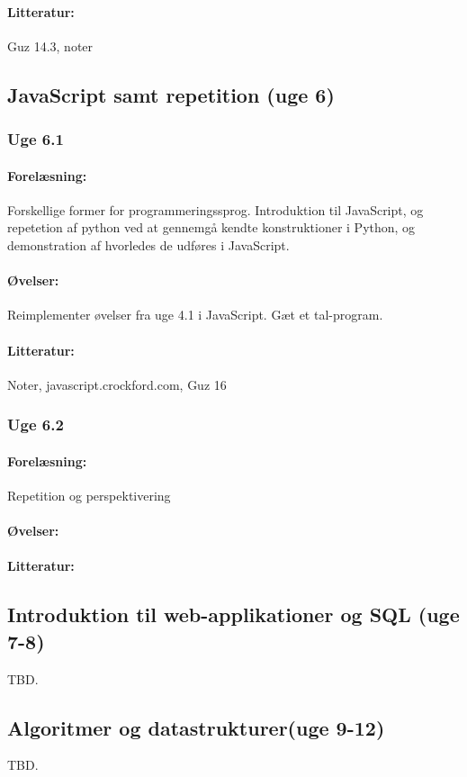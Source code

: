 \documentclass[12pt]{article}
\begin{document}
\paragraph{Litteratur:} Guz 14.3, noter

\subsection{JavaScript samt repetition (uge 6)}
\subsubsection{Uge 6.1}
\paragraph{Forelæsning:} 
Forskellige former for programmeringssprog.
Introduktion til JavaScript, og repetetion af python ved at gennemgå kendte konstruktioner i Python, og demonstration af hvorledes de udføres i JavaScript.
\paragraph{Øvelser:}
Reimplementer øvelser fra uge 4.1 i JavaScript.
Gæt et tal-program.
\paragraph{Litteratur:} Noter, javascript.crockford.com, Guz 16

\subsubsection{Uge 6.2}
\paragraph{Forelæsning:} 
Repetition og perspektivering
\paragraph{Øvelser:}
\paragraph{Litteratur:}

\subsection{Introduktion til web-applikationer og SQL (uge 7-8)}
TBD.
\subsection{Algoritmer og datastrukturer(uge 9-12)}
TBD.
\end{document}
